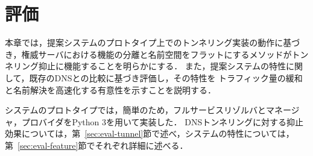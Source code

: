 \section{評価}
本章では，提案システムのプロトタイプ上でのトンネリング実装の動作に基づき，権威サーバにおける機能の分離と名前空間をフラットにするメソッドがトンネリング抑止に機能することを明らかにする．
また，提案システムの特性に関して，既存のDNSとの比較に基づき評価し，その特性を
トラフィック量の緩和と名前解決を高速化する有意性を示すことを説明する．

システムのプロトタイプでは，簡単のため，フルサービスリゾルバとマネージャ，プロバイダをPython 3を用いて実装した．
DNSトンネリングに対する抑止効果については，第~\ref{sec:eval-tunnel}節で述べ，システムの特性については，第~\ref{sec:eval-feature}節でそれぞれ詳細に述べる．


%
%
%
%
%
%
%

